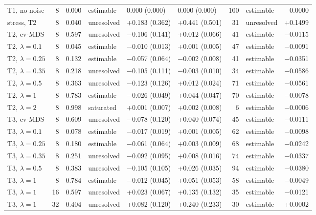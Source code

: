 \documentclass[11pt]{article}
\begin{document}
\begin{table}[!htb]
\begin{tabular}{lrrlllrlr}
\quad T1, no noise & 8 & 0.000 & estimable & 0.000 (0.000) & 0.000 (0.000) & 100 & estimable & 0.0000 \\
\quad stress, T2 & 8 & 0.040 & unresolved & +0.183 (0.362) & +0.441 (0.501) & 31 & unresolved & +0.1499 \\
\quad T2, cv-MDS & 8 & 0.597 & unresolved & $-$0.106 (0.141) & +0.012 (0.066) & 41 & estimable & $-$0.0115 \\
\quad T2, $\lambda=0.1$ & 8 & 0.045 & estimable & $-$0.010 (0.013) & +0.001 (0.005) & 47 & estimable & $-$0.0091 \\
\quad T2, $\lambda=0.25$ & 8 & 0.132 & estimable & $-$0.057 (0.064) & $-$0.002 (0.008) & 41 & estimable & $-$0.0351 \\
\quad T2, $\lambda=0.35$ & 8 & 0.218 & unresolved & $-$0.105 (0.111) & $-$0.003 (0.010) & 34 & estimable & $-$0.0586 \\
\quad T2, $\lambda=0.5$ & 8 & 0.363 & unresolved & $-$0.123 (0.126) & +0.012 (0.024) & 71 & estimable & $-$0.0561 \\
\quad T2, $\lambda=1$ & 8 & 0.783 & estimable & $-$0.026 (0.049) & +0.044 (0.047) & 70 & estimable & $-$0.0078 \\
\quad T2, $\lambda=2$ & 8 & 0.998 & saturated & +0.001 (0.007) & +0.002 (0.008) & 6 & estimable & $-$0.0006 \\
\quad T3, cv-MDS & 8 & 0.609 & unresolved & $-$0.078 (0.120) & +0.040 (0.074) & 45 & estimable & $-$0.0111 \\
\quad T3, $\lambda=0.1$ & 8 & 0.078 & estimable & $-$0.017 (0.019) & +0.001 (0.005) & 62 & estimable & $-$0.0098 \\
\quad T3, $\lambda=0.25$ & 8 & 0.180 & estimable & $-$0.061 (0.064) & +0.003 (0.009) & 68 & estimable & $-$0.0242 \\
\quad T3, $\lambda=0.35$ & 8 & 0.251 & unresolved & $-$0.092 (0.095) & +0.008 (0.016) & 74 & estimable & $-$0.0337 \\
\quad T3, $\lambda=0.5$ & 8 & 0.383 & unresolved & $-$0.105 (0.105) & +0.026 (0.035) & 94 & estimable & $-$0.0380 \\
\quad T3, $\lambda=1$ & 8 & 0.784 & estimable & $-$0.012 (0.045) & +0.051 (0.053) & 58 & estimable & $-$0.0049 \\
\quad T3, $\lambda=1$ & 16 & 0.597 & unresolved & +0.023 (0.067) & +0.135 (0.132) & 35 & estimable & $-$0.0121 \\
\quad T3, $\lambda=1$ & 32 & 0.404 & unresolved & +0.082 (0.120) & +0.240 (0.233) & 30 & estimable & +0.0002 \\

\end{tabular}
\end{table}
\end{document}
